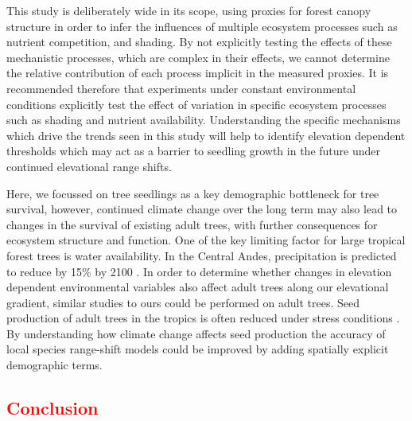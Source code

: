 \documentclass[a4paper, 11pt]{article}
\newcommand{\textapprox}{\raisebox{0.5ex}{\texttildelow}}
\newcommand{\todo}[1]{\textcolor{red}{#1}}   %
\begin{document}
This study is deliberately wide in its scope, using proxies for forest canopy structure in order to infer the influences of multiple ecosystem processes such as nutrient competition, and shading. By not explicitly testing the effects of these mechanistic processes, which are complex in their effects, we cannot determine the relative contribution of each process implicit in the measured proxies. It is recommended therefore that experiments under constant environmental conditions explicitly test the effect of variation in specific ecosystem processes such as shading and nutrient availability. Understanding the specific mechanisms which drive the trends seen in this study will help to identify elevation dependent thresholds which may act as a barrier to seedling growth in the future under continued elevational range shifts.

Here, we focussed on tree seedlings as a key demographic bottleneck for tree survival, however, continued climate change over the long term may also lead to changes in the survival of existing adult trees, with further consequences for ecosystem structure and function. One of the key limiting factor for large tropical forest trees is water availability. In the Central Andes, precipitation is predicted to reduce by \textapprox{}15\% by 2100 \citep{Lewis2011}. In order to determine whether changes in elevation dependent environmental variables also affect adult trees along our elevational gradient, similar studies to ours could be performed on adult trees. Seed production of adult trees in the tropics is often reduced under stress conditions \citep{Klimas2012, Muller-Landau2010}. By understanding how climate change affects seed production the accuracy of local species range-shift models could be improved by adding spatially explicit demographic terms.

\todo{\section*{Conclusion}}



\end{document}
